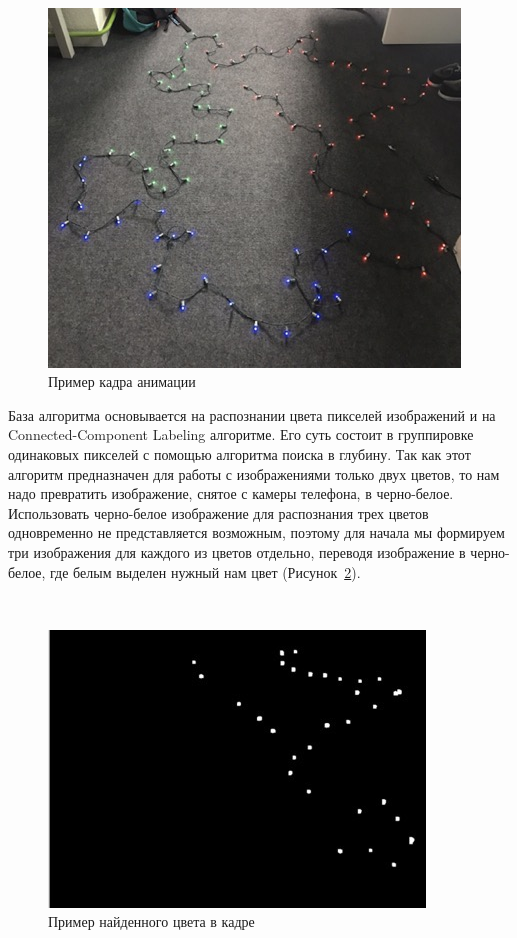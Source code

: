 ~
\begin{figure}[H]
\centering
	\includegraphics[scale=0.8]{figures/calibration/animation.jpg}
	\caption{Пример кадра анимации}
	\label{fig:develop:algorithm:animation}
\end{figure}

База алгоритма основывается на распознании цвета пикселей изображений и на Connected-Component Labeling алгоритме. Его суть состоит в группировке одинаковых пикселей с помощью алгоритма поиска в глубину. Так как этот алгоритм предназначен для работы с изображениями только двух цветов, то нам надо превратить изображение, снятое с камеры телефона, в черно-белое. Использовать черно-белое изображение для распознания трех цветов одновременно не представляется возможным, поэтому для начала мы формируем три изображения для каждого из цветов отдельно, переводя изображение в черно-белое, где белым выделен нужный нам цвет (Рисунок~\ref{fig:develop:algorithm:colorFinding}).

~
\begin{figure}[H]
\centering
	\includegraphics[scale=0.8]{figures/calibration/findedColor.jpg}
	\caption{Пример найденного цвета в кадре}
	\label{fig:develop:algorithm:colorFinding}
\end{figure}

